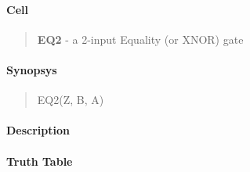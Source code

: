 \label{EQ2}
\paragraph{Cell}
\begin{quote}
    \textbf{EQ2} - a 2-input Equality (or XNOR) gate
\end{quote}

\paragraph{Synopsys}
\begin{quote}
    EQ2(Z, B, A)
\end{quote}

\paragraph{Description}



\paragraph{Truth Table}


